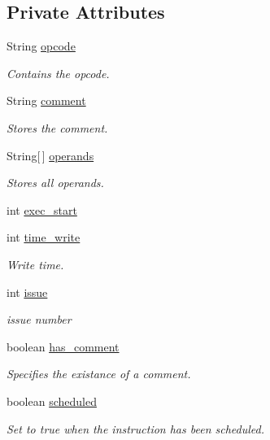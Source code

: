 \subsection*{\-Private \-Attributes}
\begin{DoxyCompactItemize}
\item 
\-String \hyperlink{classOperation_a91a69611ab1dd4ca12de1abdd49c2b42}{opcode}
\begin{DoxyCompactList}\small\item\em \-Contains the opcode. \end{DoxyCompactList}\item 
\-String \hyperlink{classOperation_a3b56588030b54deb7ffb0c5f0a4ebe68}{comment}
\begin{DoxyCompactList}\small\item\em \-Stores the comment. \end{DoxyCompactList}\item 
\-String\mbox{[}$\,$\mbox{]} \hyperlink{classOperation_ae5923860533d63c6a35d658b2683a994}{operands}
\begin{DoxyCompactList}\small\item\em \-Stores all operands. \end{DoxyCompactList}\item 
int \hyperlink{classOperation_a2dfe9cb6c6a10cb7f775036b6602bf7e}{exec\-\_\-start}
\item 
int \hyperlink{classOperation_a53e016dd4e33bdb373ca7d09d5cb8e83}{time\-\_\-write}
\begin{DoxyCompactList}\small\item\em \-Write time. \end{DoxyCompactList}\item 
int \hyperlink{classOperation_af9f72f137e8122fecde6cb26ea01db5d}{issue}
\begin{DoxyCompactList}\small\item\em issue number \end{DoxyCompactList}\item 
boolean \hyperlink{classOperation_ac3f08d5e96c77223a1fbfa68afb0d63a}{has\-\_\-comment}
\begin{DoxyCompactList}\small\item\em \-Specifies the existance of a comment. \end{DoxyCompactList}\item 
boolean \hyperlink{classOperation_a1455e6e40b057e3f25e29f7a54c6920f}{scheduled}
\begin{DoxyCompactList}\small\item\em \-Set to true when the instruction has been scheduled. \end{DoxyCompactList}\end{DoxyCompactItemize}


